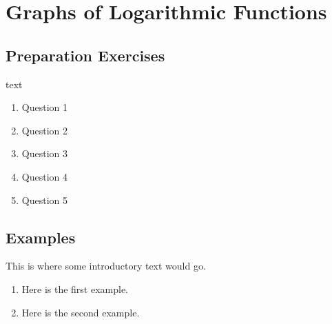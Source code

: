 

\section{Graphs of Logarithmic Functions} \label{logarithms-graph}




\subsection*{Preparation Exercises} \label{prep-logarithms-graph}

\begin{myPrep}
text

	\begin{enumerate}
		\item Question 1
		\vfill
		\item Question 2
		\vfill
		\item Question 3
		\vfill
		\item Question 4
		\vfill
		\item Question 5
		\vfill
	\end{enumerate}
\end{myPrep}


\newpage


\subsection*{Examples} \label{examples-logarithms-graph}

This is where some introductory text would go.

\begin{myExample}
\begin{enumerate}

\item Here is the first example.
\vfill

\item Here is the second example.
\vfill

\end{enumerate}
\end{myExample}

